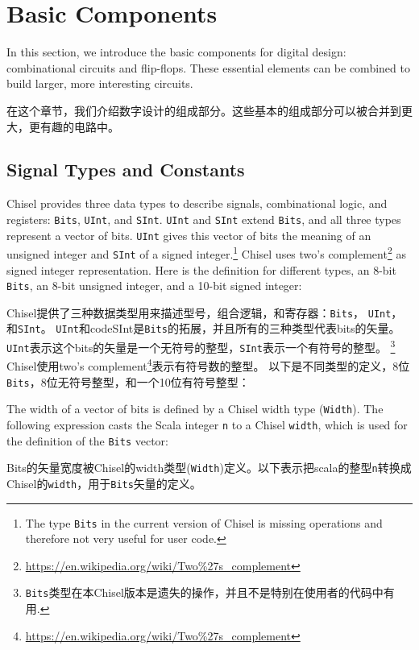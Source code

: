 \documentclass[%
    10pt,
    headinclude, footexclude,
    openright, %
    notitlepage,
    cleardoubleempty,
    headsepline,
    pointlessnumbers,
    bibtotoc, idxtotoc,
    ]{scrbook}
\newcommand{\code}[1]{{\small{\texttt{#1}}}}
\newcommand{\codefoot}[1]{{\footnotesize{\texttt{#1}}}}
\newcommand{\myref}[2]{\href{#1}{#2}}
\renewcommand{\myref}[2]{{#2}{\footnote{\url{#1}}}}
\begin{document}
\chapter{Basic Components}

In this section, we introduce the basic components for digital design:
combinational circuits and flip-flops.
These essential elements can be combined to build larger, more interesting circuits.

在这个章节，我们介绍数字设计的组成部分。这些基本的组成部分可以被合并到更大，更有趣的电路中。

\section{Signal Types and Constants}

Chisel provides three data types to describe signals, combinational logic, and registers:
\code{Bits}, \code{UInt}, and \code{SInt}. \code{UInt} and \code{SInt} extend \code{Bits},
and all three types represent a vector of bits. \code{UInt} gives this vector of
bits the meaning of an unsigned integer and \code{SInt} of a signed
integer.\footnote{The type \codefoot{Bits} in the current version of Chisel is missing operations and
therefore not very useful for user code.}
Chisel uses \myref{https://en.wikipedia.org/wiki/Two\%27s\_complement}{two's complement}
as signed integer representation.
Here is the definition for different types, an 8-bit \code{Bits}, an 8-bit unsigned integer, and a 10-bit
signed integer:

Chisel提供了三种数据类型用来描述型号，组合逻辑，和寄存器：\code{Bits}， \code{UInt}，和\code{SInt}。
\code{UInt}和code{SInt}是\code{Bits}的拓展，并且所有的三种类型代表bits的矢量。
\code{UInt}表示这个bits的矢量是一个无符号的整型，\code{SInt}表示一个有符号的整型。
\footnote{\codefoot{Bits}类型在本Chisel版本是遗失的操作，并且不是特别在使用者的代码中有用.}
Chisel使用\myref{https://en.wikipedia.org/wiki/Two\%27s\_complement}{two's complement}表示有符号数的整型。
以下是不同类型的定义，8位\code{Bits}，8位无符号整型，和一个10位有符号整型：



\noindent The width of a vector of bits is defined by a Chisel width type (\code{Width}).
The following expression casts the Scala integer \code{n} to a Chisel \code{width},
which is used for the definition of the \code{Bits} vector:

Bits的矢量宽度被Chisel的width类型(\code{Width})定义。以下表示把scala的整型\code{n}转换成Chisel的\code{width}，用于\code{Bits}矢量的定义。
\end{document}
